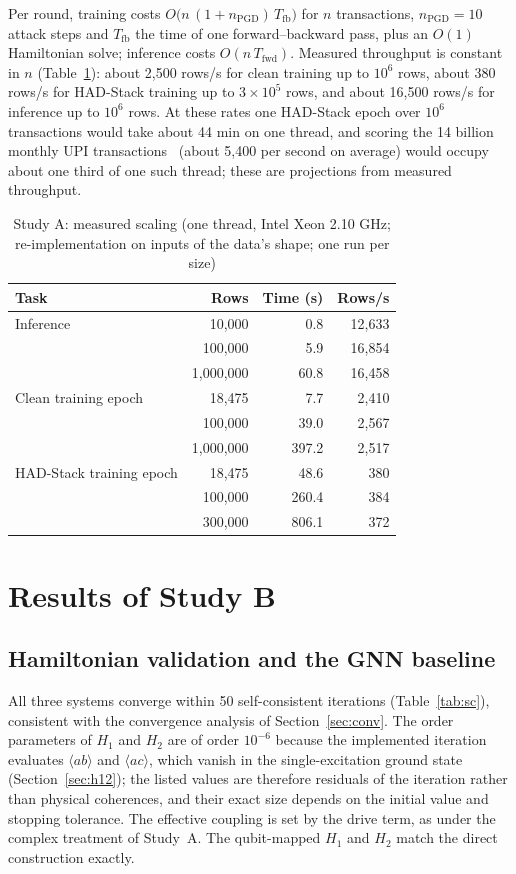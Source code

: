 \documentclass[conference]{IEEEtran}
\begin{document}
Per round, training costs $O\big(n\,(1+n_{\mathrm{PGD}})\,T_{\mathrm{fb}}\big)$ for $n$ transactions, $n_{\mathrm{PGD}}{=}10$ attack steps and $T_{\mathrm{fb}}$ the time of one forward--backward pass, plus an $O(1)$ Hamiltonian solve; inference costs $O(n\,T_{\mathrm{fwd}})$. Measured throughput is constant in $n$ (Table~\ref{tab:scale}): about 2,500 rows/s for clean training up to $10^6$ rows, about 380 rows/s for HAD-Stack training up to $3{\times}10^5$ rows, and about 16,500 rows/s for inference up to $10^6$ rows. At these rates one HAD-Stack epoch over $10^6$ transactions would take about 44 min on one thread, and scoring the 14 billion monthly UPI transactions~\cite{npci2024} (about 5,400 per second on average) would occupy about one third of one such thread; these are projections from measured throughput.

\begin{table}[t]
\centering
\caption{Study A: measured scaling (one thread, Intel Xeon 2.10 GHz; re-implementation on inputs of the data's shape; one run per size)}
\label{tab:scale}
\footnotesize
\begin{tabular}{lrrr}
\toprule
Task & Rows & Time (s) & Rows/s\\
\midrule
Inference & 10,000 & 0.8 & 12,633\\
 & 100,000 & 5.9 & 16,854\\
 & 1,000,000 & 60.8 & 16,458\\
Clean training epoch & 18,475 & 7.7 & 2,410\\
 & 100,000 & 39.0 & 2,567\\
 & 1,000,000 & 397.2 & 2,517\\
HAD-Stack training epoch & 18,475 & 48.6 & 380\\
 & 100,000 & 260.4 & 384\\
 & 300,000 & 806.1 & 372\\
\bottomrule
\end{tabular}
\end{table}

\section{Results of Study B}\label{sec:resB}
\subsection{Hamiltonian validation and the GNN baseline}
All three systems converge within 50 self-consistent iterations (Table~\ref{tab:sc}), consistent with the convergence analysis of Section~\ref{sec:conv}. The order parameters of $H_1$ and $H_2$ are of order $10^{-6}$ because the implemented iteration evaluates $\langle ab\rangle$ and $\langle ac\rangle$, which vanish in the single-excitation ground state (Section~\ref{sec:h12}); the listed values are therefore residuals of the iteration rather than physical coherences, and their exact size depends on the initial value and stopping tolerance. The effective coupling is set by the drive term, as under the complex treatment of Study~A. The qubit-mapped $H_1$ and $H_2$ match the direct construction exactly.
\end{document}
